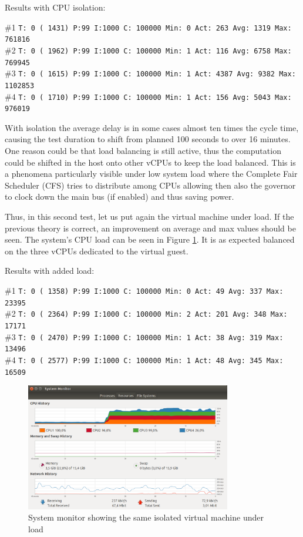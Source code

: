 \documentclass[]{scrartcl}
\begin{document}
\noindent Results with CPU isolation:

\noindent \small \#1 \texttt{T: 0 ( 1431) P:99 I:1000 C: 100000 Min: 0 Act:  263 Avg: 1319 Max:  761816}\\
\noindent \small \#2 \texttt{T: 0 ( 1962) P:99 I:1000 C: 100000 Min: 1 Act:  116 Avg: 6758 Max:  769945}\\
\noindent \small \#3 \texttt{T: 0 ( 1615) P:99 I:1000 C: 100000 Min: 1 Act: 4387 Avg: 9382 Max: 1102853}\\
\noindent \small \#4 \texttt{T: 0 ( 1710) P:99 I:1000 C: 100000 Min: 1 Act:  156 Avg: 5043 Max:  976019}

With isolation the average delay is in some cases almost ten times the cycle time, causing the test duration to shift from planned 100 seconds to over 16 minutes. One reason could be that load balancing is still active, thus the computation could be shifted in the host onto other vCPUs to keep the load balanced. This is a phenomena particularly visible under low system load where the Complete Fair Scheduler (CFS) tries to distribute among CPUs allowing then also the governor to clock down the main bus (if enabled) and thus saving power.

Thus, in this second test, let us put again the virtual machine under load. If the previous theory is correct, an improvement on average and max values should be seen. The system's CPU load can be seen in Figure \ref{fig:test-cpuload}. It is as expected balanced on the three vCPUs dedicated to the virtual guest.

\noindent Results with added load: 

\noindent \small \#1 \texttt{T: 0 ( 1358) P:99 I:1000 C: 100000 Min: 0 Act:   49 Avg:  337 Max:   23395}\\
\noindent \small \#2 \texttt{T: 0 ( 2364) P:99 I:1000 C: 100000 Min: 2 Act:  201 Avg:  348 Max:   17171}\\
\noindent \small \#3 \texttt{T: 0 ( 2470) P:99 I:1000 C: 100000 Min: 1 Act:   38 Avg:  319 Max:   13496}\\
\noindent \small \#4 \texttt{T: 0 ( 2577) P:99 I:1000 C: 100000 Min: 1 Act:   48 Avg:  345 Max:   16509}


\begin{figure}[t]
	\centering
	\includegraphics[width=0.8\textwidth]{test-cpuload}
	\caption{System monitor showing the same isolated virtual machine under load}
	\label{fig:test-cpuload}
\end{figure}
\end{document}
